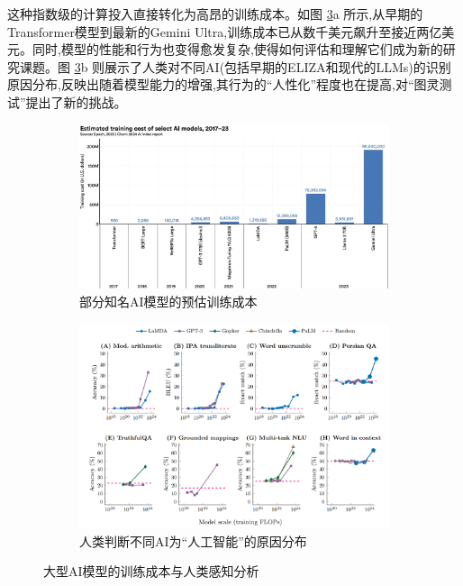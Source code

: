 这种指数级的计算投入直接转化为高昂的训练成本。如图 \ref{fig:llm_cost_perception}a 所示,从早期的Transformer模型到最新的Gemini Ultra,训练成本已从数千美元飙升至接近两亿美元。同时,模型的性能和行为也变得愈发复杂,使得如何评估和理解它们成为新的研究课题。图 \ref{fig:llm_cost_perception}b 则展示了人类对不同AI(包括早期的ELIZA和现代的LLMs)的识别原因分布,反映出随着模型能力的增强,其行为的“人性化”程度也在提高,对“图灵测试”提出了新的挑战。
\begin{figure}[H]
    \centering
    \begin{subfigure}[b]{0.48\textwidth}
        \centering
        \includegraphics[width=\textwidth]{figures/LLM5.png}
        \caption{部分知名AI模型的预估训练成本}
        \label{fig:llm_training_cost}
    \end{subfigure}
    \hfill
    \begin{subfigure}[b]{0.48\textwidth}
        \centering
        \includegraphics[width=\textwidth]{figures/LLM6.png}
        \caption{人类判断不同AI为“人工智能”的原因分布}
        \label{fig:llm_reason_class}
    \end{subfigure}
    \caption{大型AI模型的训练成本与人类感知分析}
    \label{fig:llm_cost_perception}
\end{figure}


